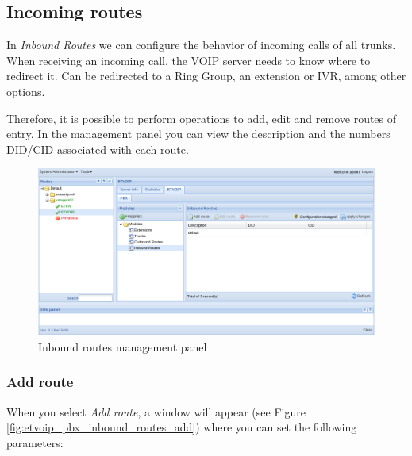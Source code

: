 \subsection{Incoming routes}
In \emph{Inbound Routes} we can configure the behavior of incoming calls of all trunks.
When receiving an incoming call, the VOIP server needs to know where to redirect it.
Can be redirected to a Ring Group, an extension or IVR, among other options.

Therefore, it is possible to perform operations to add, edit and remove routes of entry.
In the management panel you can view the description and the numbers DID/CID associated with each route.

\begin{figure}[H]
        \begin{center}
        \includegraphics[scale=0.45]{screenshots/etvoip_pbx_inbound_routes.png}
        \caption{Inbound routes management panel}
        \label{fig:etvoip_pbx_inbound_routes}
        \end{center}
\end{figure}

\subsubsection{Add route}
\label{sec:etvoip_pbx_inbound_routes_add}

When you select \emph{Add route}, a window will appear (see Figure \ref{fig:etvoip_pbx_inbound_routes_add}) where you can set the following parameters:


